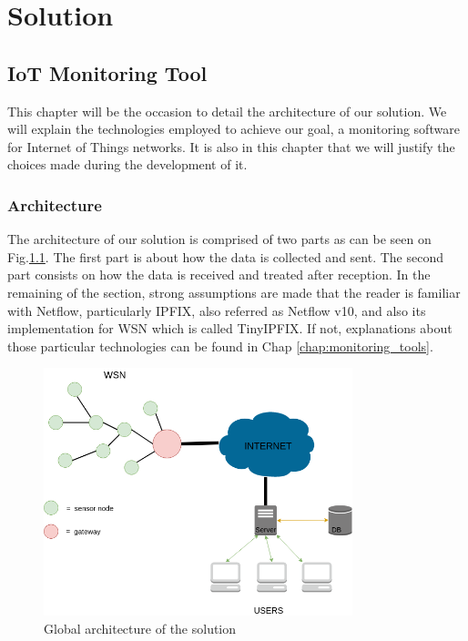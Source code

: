 \part{Solution} \label{part:solution}

\chapter{IoT Monitoring Tool}

This chapter will be the occasion to detail the architecture of our solution. We will explain the technologies employed to achieve our goal, a monitoring software for Internet of Things networks. It is also in this chapter that we will justify the choices made during the development of it.

\section{Architecture}

The architecture of our solution is comprised of two parts as can be seen on Fig.\ref{fig:design}. The first part is about how the data is collected and sent. The second part consists on how the data is received and treated after reception. In the remaining of the section, strong assumptions are made that the reader is familiar with Netflow, particularly IPFIX, also referred as Netflow v10, and also its implementation for WSN which is called TinyIPFIX. If not, explanations about those particular technologies can be found in Chap \ref{chap:monitoring_tools}. \\

\begin{figure}
	\centering
	\includegraphics[width=0.8\textwidth]{res/design.png}
	\caption{Global architecture of the solution}
	\label{fig:design}
\end{figure}

